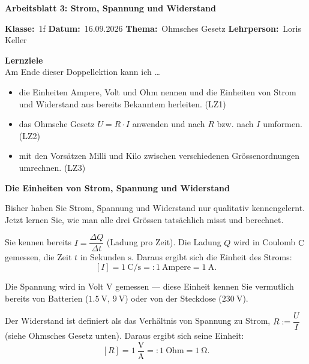 \documentclass[addpoints,11pt,a4paper]{exam}
\newenvironment{infobox}{%
  \par\addvspace{10pt}\noindent
}{%
  \par\addvspace{10pt}
}
\newenvironment{theoriebox}[1][Theorie]{%
  \par\addvspace{10pt}\noindent\textbf{#1}\par\smallskip\noindent
}{%
  \par\addvspace{10pt}
}
\newcommand{\Kopfzeile}[4]{%
  \begin{titlebox}
    {\color{white}\sffamily\bfseries\Large #4}
  \end{titlebox}
  \vspace{0.5em}
  \noindent\textbf{Klasse:}~#1 \hfill \textbf{Datum:}~#2 \hfill \textbf{Thema:}~#3
    \hfill \textbf{Lehrperson:}~Loris Keller
  \vspace{0.8em}
  \lhead{\textcolor{darkgray}{#3}}
  \rhead{\textcolor{darkgray}{#4}}
}
\newcommand{\Klasse}{1f}
\newcommand{\Datum}{16.09.2026}
\newcommand{\Thema}{Ohmsches Gesetz}
\newcommand{\ArbeitsblattTitel}{Arbeitsblatt 3: Strom, Spannung und Widerstand}
\begin{document}
\Kopfzeile{\Klasse}{\Datum}{\Thema}{\ArbeitsblattTitel}

\begin{infobox}
\textbf{Lernziele}\\
Am Ende dieser Doppellektion kann ich \dots
\begin{itemize}[leftmargin=1.2cm,itemsep=0.3em]
  \item die Einheiten Ampere, Volt und Ohm nennen und die Einheiten von Strom und Widerstand aus bereits Bekanntem herleiten. (LZ1)
  \item das Ohmsche Gesetz $U=R\cdot I$ anwenden und nach $R$ bzw. nach $I$ umformen. (LZ2)
  \item mit den Vorsätzen Milli und Kilo zwischen verschiedenen Grössenordnungen umrechnen. (LZ3)
\end{itemize}
\end{infobox}

\needspace{6cm}
\begin{theoriebox}[Die Einheiten von Strom, Spannung und Widerstand]
Bisher haben Sie Strom, Spannung und Widerstand nur qualitativ
kennengelernt. Jetzt lernen Sie, wie man alle drei Grössen tatsächlich
misst und berechnet.
\end{theoriebox}

\needspace{7cm}
\begin{formelbox}[Strom $I$]
Sie kennen bereits $I=\dfrac{\Delta Q}{\Delta t}$ (Ladung pro Zeit). Die
Ladung $Q$ wird in Coulomb $\si{\coulomb}$ gemessen, die Zeit $t$ in
Sekunden $\si{\second}$. Daraus ergibt sich die Einheit des Stroms:
\[
  [I] = 1\ \si{\coulomb\per\second} =: 1\ \text{Ampere} = 1\ \si{\ampere}.
\]
\end{formelbox}

\needspace{5cm}
\begin{formelbox}[Spannung $U$]
Die Spannung wird in Volt $\si{\volt}$ gemessen — diese Einheit kennen
Sie vermutlich bereits von Batterien ($\SI{1.5}{\volt}$, $\SI{9}{\volt}$)
oder von der Steckdose ($\SI{230}{\volt}$).
\end{formelbox}

\needspace{7cm}
\begin{formelbox}[Widerstand $R$]
Der Widerstand ist definiert als das Verhältnis von Spannung zu Strom,
$R:=\dfrac{U}{I}$ (siehe Ohmsches Gesetz unten). Daraus ergibt sich seine
Einheit:
\[
  [R] = 1\ \frac{\si{\volt}}{\si{\ampere}} =: 1\ \text{Ohm} = 1\ \si{\ohm}.
\]
\end{formelbox}
\end{document}
